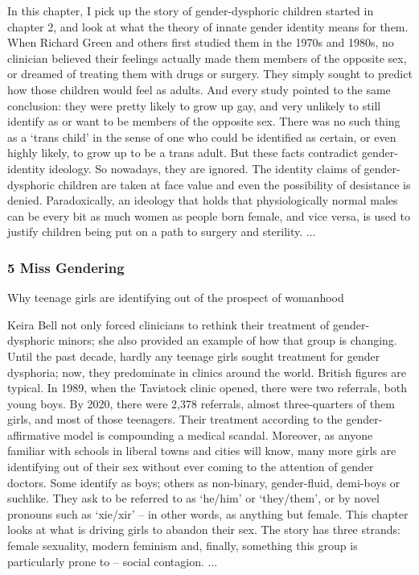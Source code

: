 \documentclass[10pt,titlepage]{book}
\begin{document}
In this chapter, I pick up the story of gender-dysphoric children started in chapter 2, and look at what the theory of innate gender identity means for them. When Richard Green and others first studied them in the 1970s and 1980s, no clinician believed their feelings actually made them members of the opposite sex, or dreamed of treating them with drugs or surgery. They simply sought to predict how those children would feel as adults. And every study pointed to the same conclusion: they were pretty likely to grow up gay, and very unlikely to still identify as or want to be members of the opposite sex. There was no such thing as a ‘trans child’ in the sense of one who could be identified as certain, or even highly likely, to grow up to be a trans adult. But these facts contradict gender-identity ideology. So nowadays, they are ignored. The identity claims of gender-dysphoric children are taken at face value and even the possibility of desistance is denied. Paradoxically, an ideology that holds that physiologically normal males can be every bit as much women as people born female, and vice versa, is used to justify children being put on a path to surgery and sterility.
...

\subsubsection{5 Miss Gendering}

Why teenage girls are identifying out of the prospect of womanhood

Keira Bell not only forced clinicians to rethink their treatment of gender-dysphoric minors; she also provided an example of how that group is changing. Until the past decade, hardly any teenage girls sought treatment for gender dysphoria; now, they predominate in clinics around the world. British figures are typical. In 1989, when the Tavistock clinic opened, there were two referrals, both young boys. By 2020, there were 2,378 referrals, almost three-quarters of them girls, and most of those teenagers. Their treatment according to the gender-affirmative model is compounding a medical scandal. Moreover, as anyone familiar with schools in liberal towns and cities will know, many more girls are identifying out of their sex without ever coming to the attention of gender doctors. Some identify as boys; others as non-binary, gender-fluid, demi-boys or suchlike. They ask to be referred to as ‘he/him’ or ‘they/them’, or by novel pronouns such as ‘xie/xir’ – in other words, as anything but female. This chapter looks at what is driving girls to abandon their sex. The story has three strands: female sexuality, modern feminism and, finally, something this group is particularly prone to – social contagion.
...
\end{document}
